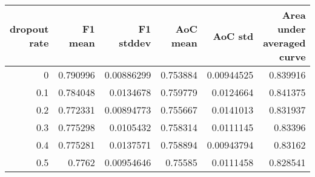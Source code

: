 \begin{tabular}{rrrrrr}
\toprule
   dropout rate &   F1 mean &   F1 stddev &   AoC mean &    AoC std &   Area under averaged curve \\
\midrule
            0   &  0.790996 &  0.00886299 &   0.753884 & 0.00944525 &                    0.839916 \\
            0.1 &  0.784048 &  0.0134678  &   0.759779 & 0.0124664  &                    0.841375 \\
            0.2 &  0.772331 &  0.00894773 &   0.755667 & 0.0141013  &                    0.831937 \\
            0.3 &  0.775298 &  0.0105432  &   0.758314 & 0.0111145  &                    0.83396  \\
            0.4 &  0.775281 &  0.0137571  &   0.758894 & 0.00943794 &                    0.83162  \\
            0.5 &  0.7762   &  0.00954646 &   0.75585  & 0.0111458  &                    0.828541 \\
\bottomrule
\end{tabular}